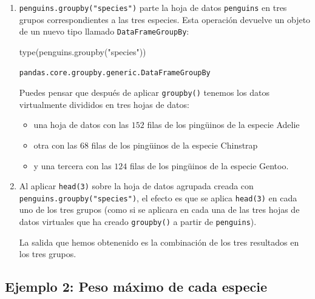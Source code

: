 \documentclass[
  a4paper,
  noprof,
  12pt,
  notoc,
  nosols,
  nobib]{mnye}
\newenvironment{Shaded}{\begin{snugshade}}{\end{snugshade}}
\newcommand{\BuiltInTok}[1]{\textcolor[rgb]{0.00,0.23,0.31}{#1}}
\newcommand{\NormalTok}[1]{\textcolor[rgb]{0.00,0.23,0.31}{#1}}
\newcommand{\StringTok}[1]{\textcolor[rgb]{0.13,0.47,0.30}{#1}}
\providecommand{\tightlist}{%
  \setlength{\itemsep}{0pt}\setlength{\parskip}{0pt}}\usepackage{longtable,booktabs,array}
\theoremstyle{definition}
\theoremstyle{remark}
\begin{document}
\begin{enumerate}
\def\labelenumi{\arabic{enumi}.}
\item
  \texttt{penguins.groupby("species")} parte la hoja de datos
  \texttt{penguins} en tres grupos correspondientes a las tres especies.
  Esta operación devuelve un objeto de un nuevo tipo llamado
  \texttt{DataFrameGroupBy}:

\begin{Shaded}
\begin{Highlighting}[]
\BuiltInTok{type}\NormalTok{(penguins.groupby(}\StringTok{"species"}\NormalTok{))}
\end{Highlighting}
\end{Shaded}

\begin{verbatim}
pandas.core.groupby.generic.DataFrameGroupBy
\end{verbatim}

  Puedes pensar que después de aplicar \texttt{groupby()} tenemos los
  datos virtualmente divididos en tres hojas de datos:

  \begin{itemize}
  \tightlist
  \item
    una hoja de datos con las \(152\) filas de los pingüinos de la
    especie Adelie
  \item
    otra con las \(68\) filas de los pingüinos de la especie Chinstrap
  \item
    y una tercera con las \(124\) filas de los pingüinos de la especie
    Gentoo.
  \end{itemize}
\item
  Al aplicar \texttt{head(3)} sobre la hoja de datos agrupada creada con
  \texttt{penguins.groupby("species")}, el efecto es que se aplica
  \texttt{head(3)} en cada uno de los tres grupos (como si se aplicara
  en cada una de las tres hojas de datos virtuales que ha creado
  \texttt{groupby()} a partir de \texttt{penguins}).

  La salida que hemos obtenenido es la combinación de los tres
  resultados en los tres grupos.
\end{enumerate}

\subsection*{Ejemplo 2: Peso máximo de cada
especie}\label{ejemplo-2-peso-muxe1ximo-de-cada-especie}
\end{document}
